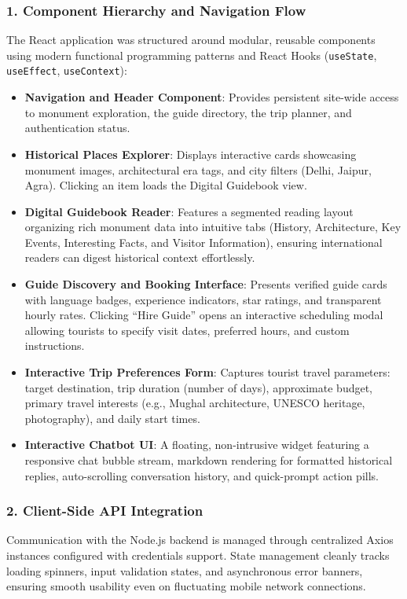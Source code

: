 \documentclass[12pt,a4paper,twoside,openright]{report}
\begin{document}
\subsubsection{1. Component Hierarchy and Navigation Flow}
The React application was structured around modular, reusable components using modern functional programming patterns and React Hooks (\texttt{useState}, \texttt{useEffect}, \texttt{useContext}):
\begin{itemize}[leftmargin=*]
    \item \textbf{Navigation and Header Component}: Provides persistent site-wide access to monument exploration, the guide directory, the trip planner, and authentication status.
    \item \textbf{Historical Places Explorer}: Displays interactive cards showcasing monument images, architectural era tags, and city filters (Delhi, Jaipur, Agra). Clicking an item loads the Digital Guidebook view.
    \item \textbf{Digital Guidebook Reader}: Features a segmented reading layout organizing rich monument data into intuitive tabs (History, Architecture, Key Events, Interesting Facts, and Visitor Information), ensuring international readers can digest historical context effortlessly.
    \item \textbf{Guide Discovery and Booking Interface}: Presents verified guide cards with language badges, experience indicators, star ratings, and transparent hourly rates. Clicking ``Hire Guide'' opens an interactive scheduling modal allowing tourists to specify visit dates, preferred hours, and custom instructions.
    \item \textbf{Interactive Trip Preferences Form}: Captures tourist travel parameters: target destination, trip duration (number of days), approximate budget, primary travel interests (e.g., Mughal architecture, UNESCO heritage, photography), and daily start times.
    \item \textbf{Interactive Chatbot UI}: A floating, non-intrusive widget featuring a responsive chat bubble stream, markdown rendering for formatted historical replies, auto-scrolling conversation history, and quick-prompt action pills.
\end{itemize}

\subsubsection{2. Client-Side API Integration}
Communication with the Node.js backend is managed through centralized Axios instances configured with credentials support. State management cleanly tracks loading spinners, input validation states, and asynchronous error banners, ensuring smooth usability even on fluctuating mobile network connections.
\end{document}
